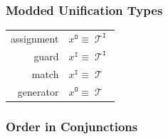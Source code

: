 \documentclass[xcolor=table, aspectratio=169]{beamer}
\DeclareMathOperator{\Term}{\mathcal{T}}
\DeclareMathOperator{\inmode}{\mathtt{I}}
\DeclareMathOperator{\outmode}{\mathtt{O}}
\begin{document}
\begin{frame}[fragile]
  \frametitle{Modded Unification Types}

\begin{center}
\begin{tabular}{rl}
  assignment & $x^{\outmode} \equiv \Term^{\inmode} $ \\
  guard      & $x^{\inmode}  \equiv \Term^{\inmode} $ \\
  match      & $x^{\inmode}  \equiv \Term           $ \\
  generator  & $x^{\outmode} \equiv \Term           $
\end{tabular}
\end{center}

\end{frame}



\begin{frame}[fragile]
  \frametitle{Order in Conjunctions}

\end{frame}


%     
%     






%     
%     
\end{document}
